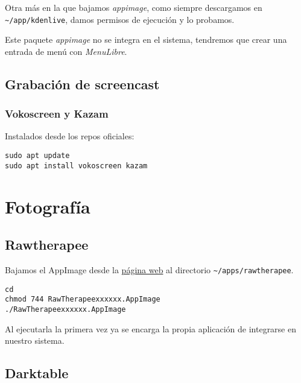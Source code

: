 \documentclass[
  12pt,
  spanish,
]{article}
\begin{document}
Otra más en la que bajamos \emph{appimage}, como siempre descargamos en
\texttt{\textasciitilde{}/app/kdenlive}, damos permisos de ejecución y
lo probamos.

Este paquete \emph{appimage} no se integra en el sistema, tendremos que
crear una entrada de menú con \emph{MenuLibre}.

\hypertarget{grabaciuxf3n-de-screencast}{%
\subsection{Grabación de screencast}\label{grabaciuxf3n-de-screencast}}

\hypertarget{vokoscreen-y-kazam}{%
\subsubsection{Vokoscreen y Kazam}\label{vokoscreen-y-kazam}}

Instalados desde los repos oficiales:

\begin{verbatim}
sudo apt update
sudo apt install vokoscreen kazam
\end{verbatim}

\hypertarget{fotografuxeda}{%
\section{Fotografía}\label{fotografuxeda}}

\hypertarget{rawtherapee}{%
\subsection{Rawtherapee}\label{rawtherapee}}

Bajamos el AppImage desde la \href{http://rawtherapee.com/}{página web}
al directorio \texttt{\textasciitilde{}/apps/rawtherapee}.

\begin{verbatim}
cd
chmod 744 RawTherapeexxxxxx.AppImage
./RawTherapeexxxxxx.AppImage
\end{verbatim}

Al ejecutarla la primera vez ya se encarga la propia aplicación de
integrarse en nuestro sistema.

\hypertarget{darktable}{%
\subsection{Darktable}\label{darktable}}
\end{document}
